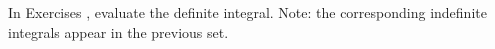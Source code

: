 {\noindent In Exercises}
{, evaluate the definite integral. Note: the corresponding indefinite integrals appear in the previous set.}
